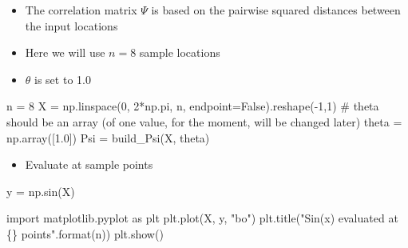\documentclass[
  letterpaper,
  DIV=11,
  numbers=noendperiod]{scrreprt}
\newenvironment{Shaded}{\begin{snugshade}}{\end{snugshade}}
\newcommand{\BuiltInTok}[1]{\textcolor[rgb]{0.00,0.23,0.31}{#1}}
\newcommand{\CommentTok}[1]{\textcolor[rgb]{0.37,0.37,0.37}{#1}}
\newcommand{\DecValTok}[1]{\textcolor[rgb]{0.68,0.00,0.00}{#1}}
\newcommand{\FloatTok}[1]{\textcolor[rgb]{0.68,0.00,0.00}{#1}}
\newcommand{\ImportTok}[1]{\textcolor[rgb]{0.00,0.46,0.62}{#1}}
\newcommand{\NormalTok}[1]{\textcolor[rgb]{0.00,0.23,0.31}{#1}}
\newcommand{\OperatorTok}[1]{\textcolor[rgb]{0.37,0.37,0.37}{#1}}
\newcommand{\SpecialCharTok}[1]{\textcolor[rgb]{0.37,0.37,0.37}{#1}}
\newcommand{\StringTok}[1]{\textcolor[rgb]{0.13,0.47,0.30}{#1}}
\newcommand{\VariableTok}[1]{\textcolor[rgb]{0.07,0.07,0.07}{#1}}
\providecommand{\tightlist}{%
  \setlength{\itemsep}{0pt}\setlength{\parskip}{0pt}}\usepackage{longtable,booktabs,array}
\begin{document}
\begin{itemize}
\tightlist
\item
  The correlation matrix \(\Psi\) is based on the pairwise squared
  distances between the input locations
\item
  Here we will use \(n=8\) sample locations
\item
  \(\theta\) is set to 1.0
\end{itemize}

\begin{Shaded}
\begin{Highlighting}[]
\NormalTok{n }\OperatorTok{=} \DecValTok{8}
\NormalTok{X }\OperatorTok{=}\NormalTok{ np.linspace(}\DecValTok{0}\NormalTok{, }\DecValTok{2}\OperatorTok{*}\NormalTok{np.pi, n, endpoint}\OperatorTok{=}\VariableTok{False}\NormalTok{).reshape(}\OperatorTok{{-}}\DecValTok{1}\NormalTok{,}\DecValTok{1}\NormalTok{)}
\CommentTok{\# theta should be an array (of one value, for the moment, will be changed later)}
\NormalTok{theta }\OperatorTok{=}\NormalTok{ np.array([}\FloatTok{1.0}\NormalTok{])}
\NormalTok{Psi }\OperatorTok{=}\NormalTok{ build\_Psi(X, theta)}
\end{Highlighting}
\end{Shaded}

\begin{itemize}
\tightlist
\item
  Evaluate at sample points
\end{itemize}

\begin{Shaded}
\begin{Highlighting}[]
\NormalTok{y }\OperatorTok{=}\NormalTok{ np.sin(X)}
\end{Highlighting}
\end{Shaded}

\begin{Shaded}
\begin{Highlighting}[]
\ImportTok{import}\NormalTok{ matplotlib.pyplot }\ImportTok{as}\NormalTok{ plt}
\NormalTok{plt.plot(X, y, }\StringTok{"bo"}\NormalTok{)}
\NormalTok{plt.title(}\StringTok{"Sin(x) evaluated at }\SpecialCharTok{\{\}}\StringTok{ points"}\NormalTok{.}\BuiltInTok{format}\NormalTok{(n))}
\NormalTok{plt.show()}
\end{Highlighting}
\end{Shaded}
\end{document}
